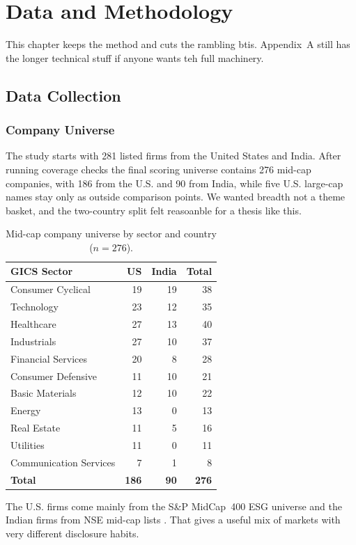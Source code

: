 \chapter{Data and Methodology}
\label{ch:data_methods}
This chapter keeps the method and cuts the rambling btis. Appendix~A still has the longer technical stuff if anyone wants teh full machinery.

\section{Data Collection}
\label{sec:data_collection}
\subsection{Company Universe}
\label{sec:company_universe}
The study starts with 281 listed firms from the United States and India. After running coverage checks the final scoring universe contains 276 mid-cap companies, with 186 from the U.S. and 90 from India, while five U.S. large-cap names stay only as outside comparison points. We wanted breadth not a theme basket, and the two-country split felt reasoanble for a thesis like this.
\begin{table}[!htbp]
\centering
\caption{Mid-cap company universe by sector and country ($n=276$).}\label{tab:sector_distribution}\small
\begin{tabular}{@{}lrrr@{}}
\toprule
\textbf{GICS Sector} & \textbf{US} & \textbf{India} & \textbf{Total} \\
\midrule
Consumer Cyclical & 19 & 19 & 38 \\
Technology & 23 & 12 & 35 \\
Healthcare & 27 & 13 & 40 \\
Industrials & 27 & 10 & 37 \\
Financial Services & 20 & 8 & 28 \\
Consumer Defensive & 11 & 10 & 21 \\
Basic Materials & 12 & 10 & 22 \\
Energy & 13 & 0 & 13 \\
Real Estate & 11 & 5 & 16 \\
Utilities & 11 & 0 & 11 \\
Communication Services & 7 & 1 & 8 \\
\midrule
\textbf{Total} & \textbf{186} & \textbf{90} & \textbf{276} \\
\bottomrule
\end{tabular}
\end{table}
The U.S. firms come mainly from the S\&P MidCap~400 ESG universe and the Indian firms from NSE mid-cap lists \cite{nse_esg}. That gives a useful mix of markets with very different disclosure habits.

